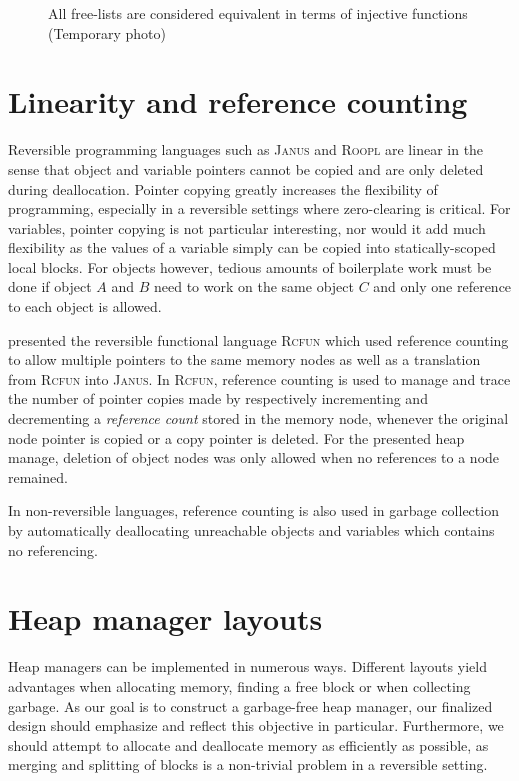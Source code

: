\begin{figure}[ht]
\centering
\caption{All free-lists are considered equivalent in terms of injective functions (Temporary photo)}
\label{fig:equivalent-free-lists}
\end{figure}

\section{Linearity and reference counting}
\label{sec:referencing}
Reversible programming languages such as \textsc{Janus} and \textsc{Roopl} are linear in the sense that object and variable pointers cannot be copied and are only deleted during deallocation. Pointer copying greatly increases the flexibility of programming, especially in a reversible settings where zero-clearing is critical. For variables, pointer copying is not particular interesting, nor would it add much flexibility as the values of a variable simply can be copied into statically-scoped local blocks. For objects however, tedious amounts of boilerplate work must be done if object $A$ and $B$ need to work on the same object $C$ and only one reference to each object is allowed.

 \citeauthor{tm:refcounting} presented the reversible functional language \textsc{Rcfun} which used reference counting to allow multiple pointers to the same memory nodes as well as a translation from \textsc{Rcfun} into \textsc{Janus}. In \textsc{Rcfun}, reference counting is used to manage and trace the number of pointer copies made by respectively incrementing and decrementing a \textit{reference count} stored in the memory node, whenever the original node pointer is copied or a copy pointer is deleted. For the presented heap manage, deletion of object nodes was only allowed when no references to a node remained.

In non-reversible languages, reference counting is also used in garbage collection by automatically deallocating unreachable objects and variables which contains no referencing. 


\section{Heap manager layouts}
\label{sec:heap-manager-layout}
Heap managers can be implemented in numerous ways. Different layouts yield advantages when allocating memory, finding a free block or when collecting garbage. As our goal is to construct a garbage-free heap manager, our finalized design should emphasize and reflect this objective in particular. Furthermore, we should attempt to allocate and deallocate memory as efficiently as possible, as merging and splitting of blocks is a non-trivial problem in a reversible setting.

